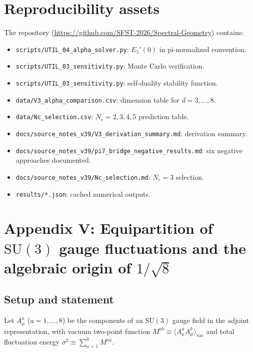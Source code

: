 \documentclass[11pt,a4paper]{article}
\begin{document}
\section{Reproducibility assets}
The repository (\url{https://github.com/SFST-2026/Spectral-Geometry}) contains:
\begin{itemize}[leftmargin=1.5em]
\item \texttt{scripts/UTIL\_04\_alpha\_solver.py}: $E_5'(0)$ in pi-normalized convention.
\item \texttt{scripts/UTIL\_03\_sensitivity.py}: Monte Carlo verification.
\item \texttt{scripts/UTIL\_03\_sensitivity.py}: self-duality stability function.
\item \texttt{data/V3\_alpha\_comparison.csv}: dimension table for $d=3,\ldots,8$.
\item \texttt{data/Nc\_selection.csv}: $N_c=2,3,4,5$ prediction table.
\item \texttt{docs/source\_notes\_v39/V3\_derivation\_summary.md}: derivation summary.
\item \texttt{docs/source\_notes\_v39/pi7\_bridge\_negative\_results.md}:
  six negative approaches documented.
\item \texttt{docs/source\_notes\_v39/Nc\_selection.md}: $N_c=3$ selection.
\item \texttt{results/*.json}: cached numerical outputs.
\end{itemize}

\section{Appendix V: Equipartition of $\mathrm{SU}(3)$ gauge fluctuations
  and the algebraic origin of $1/\sqrt{8}$}
\label{app:equipartition}

\subsection{Setup and statement}

Let $A^a_\mu$ ($a=1,\ldots,8$) be the components of an $\mathrm{SU}(3)$ gauge
field in the adjoint representation, with vacuum two-point function
$M^{ab}\equiv\langle A^a_\mu A^b_\mu\rangle_{\mathrm{vac}}$ and total fluctuation
energy $\sigma^2\equiv\sum_{a=1}^8M^{aa}$.
\end{document}
